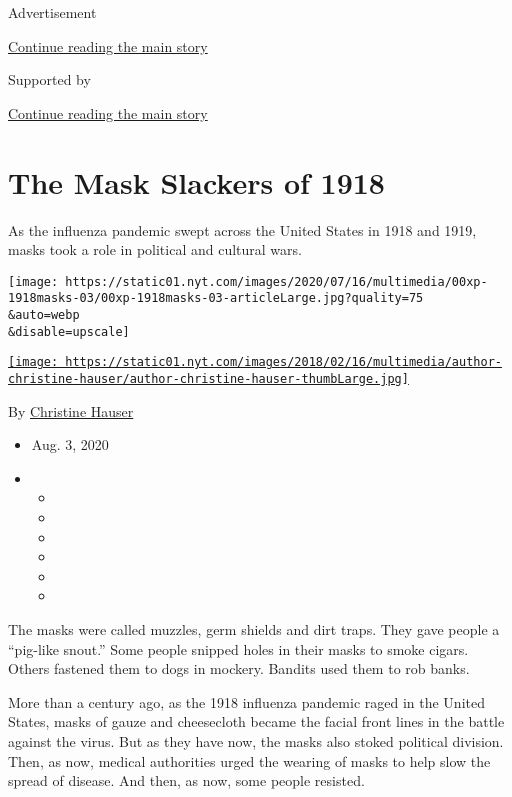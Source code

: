 Advertisement

\protect\hyperlink{after-top}{Continue reading the main story}

Supported by

\protect\hyperlink{after-sponsor}{Continue reading the main story}

\hypertarget{the-mask-slackers-of-1918}{%
\section{The Mask Slackers of 1918}\label{the-mask-slackers-of-1918}}

As the influenza pandemic swept across the United States in 1918 and
1919, masks took a role in political and cultural wars.

\texttt{[image: https://static01.nyt.com/images/2020/07/16/multimedia/00xp-1918masks-03/00xp-1918masks-03-articleLarge.jpg?quality=75\\\&auto=webp\\\&disable=upscale]}

\href{https://www.nytimes.com/by/christine-hauser}{\texttt{[image: https://static01.nyt.com/images/2018/02/16/multimedia/author-christine-hauser/author-christine-hauser-thumbLarge.jpg]}}

By \href{https://www.nytimes.com/by/christine-hauser}{Christine Hauser}

\begin{itemize}
\item
  Aug. 3, 2020
\item
  \begin{itemize}
  \item
  \item
  \item
  \item
  \item
  \item
  \end{itemize}
\end{itemize}

The masks were called muzzles, germ shields and dirt traps. They gave
people a ``pig-like snout.'' Some people snipped holes in their masks to
smoke cigars. Others fastened them to dogs in mockery. Bandits used them
to rob banks.

More than a century ago, as the 1918 influenza pandemic raged in the
United States, masks of gauze and cheesecloth became the facial front
lines in the battle against the virus. But as they have now, the masks
also stoked political division. Then, as now, medical authorities urged
the wearing of masks to help slow the spread of disease. And then, as
now, some people resisted.

